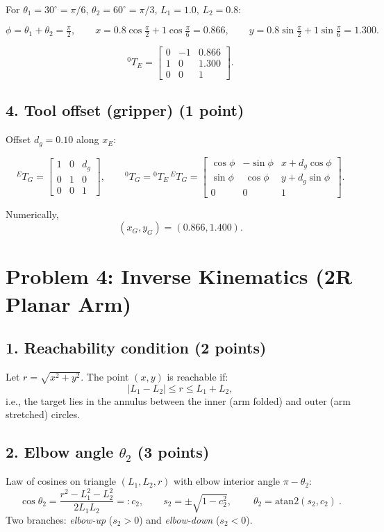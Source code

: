 \documentclass[11pt]{article}
\begin{document}
For $\theta_1=30^\circ=\pi/6$, $\theta_2=60^\circ=\pi/3$, $L_1=1.0$, $L_2=0.8$:

\[
\phi=\theta_1+\theta_2=\tfrac{\pi}{2},\qquad
x=0.8\cos\tfrac{\pi}{2}+1\cos\tfrac{\pi}{6}=0.866,\qquad
y=0.8\sin\tfrac{\pi}{2}+1\sin\tfrac{\pi}{6}=1.300.
\]

\[
{}^{0}\!T_{E}=
\begin{bmatrix}
0 & -1 & 0.866\\
1 & 0 & 1.300\\
0 & 0 & 1
\end{bmatrix}.
\]

\subsection*{4. Tool offset (gripper) (1 point)}

Offset $d_g=0.10$ along $x_E$:

\[
{}^{E}\!T_{G}=
\begin{bmatrix}
1&0&d_g\\
0&1&0\\
0&0&1
\end{bmatrix},
\qquad
{}^{0}\!T_{G} = {}^{0}\!T_{E}\,{}^{E}\!T_{G}
=
\begin{bmatrix}
\cos\phi & -\sin\phi & x+d_g\cos\phi\\
\sin\phi & \ \cos\phi & y+d_g\sin\phi\\
0&0&1
\end{bmatrix}.
\]

Numerically,
\[
(x_G,y_G)=(0.866,1.400).
\]


\section*{Problem 4: Inverse Kinematics (2R Planar Arm)}

\subsection*{1. Reachability condition (2 points)}
Let $r=\sqrt{x^2+y^2}$. The point $(x,y)$ is reachable if:
\[
\boxed{|L_1-L_2|\le r\le L_1+L_2},
\]
i.e., the target lies in the annulus between the inner (arm folded) and outer (arm stretched) circles.

\subsection*{2. Elbow angle $\theta_2$ (3 points)}
Law of cosines on triangle $(L_1,L_2,r)$ with elbow interior angle $\pi-\theta_2$:
\[
\cos\theta_2=\frac{r^2-L_1^2-L_2^2}{2L_1L_2}=:c_2,\qquad
s_2=\pm\sqrt{1-c_2^2},\qquad
\boxed{\ \theta_2=\mathrm{atan2}(s_2,c_2)\ }.
\]
Two branches: \emph{elbow-up} ($s_2>0$) and \emph{elbow-down} ($s_2<0$).
\end{document}
